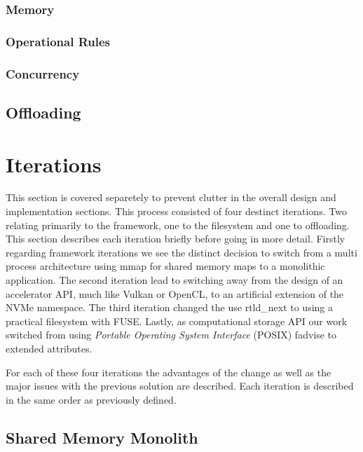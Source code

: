 \subsubsection{Memory}

\subsubsection{Operational Rules}

\subsubsection{Concurrency}

\subsection{Offloading}


\section{Iterations}

This section is covered separetely to prevent clutter in the overall design and
implementation sections. This process consisted of four destinct iterations.
Two relating primarily to the framework, one to the filesystem and one to
offloading. This section describes each iteration briefly before going in more
detail. Firstly regarding framework iterations we see the distinct decision
to switch from a multi process architecture using mmap for shared memory maps to
a monolithic application. The second iteration lead to switching away from the
design of an accelerator API, much like Vulkan \cite{vulkan} or OpenCL, to an
artificial extension of the NVMe namespace. The third iteration changed the use
rtld\_next \cite{rtldnext} to using a practical filesystem with FUSE. Lastly, as
computational storage API our work switched from using
\textit{Portable Operating System Interface} (POSIX) fadvise \cite{fadvise} to
extended attributes.

For each of these four iterations the advantages of the change as well as the
major issues with the previous solution are described. Each iteration is
described in the same order as previously defined.

\subsection{Shared Memory Monolith}

